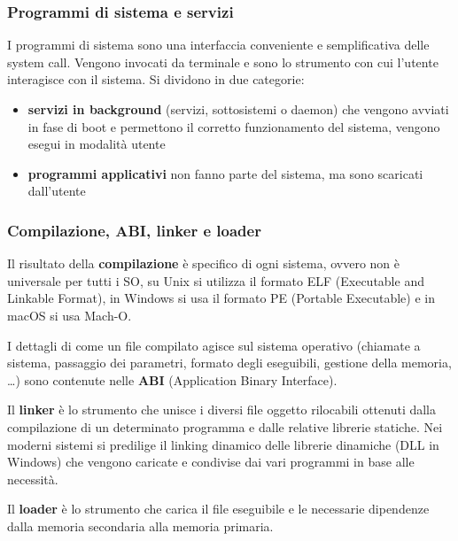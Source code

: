 \documentclass[a4paper]{article}
\begin{document}
\subsubsection*{Programmi di sistema e servizi}
I programmi di sistema sono una interfaccia conveniente e semplificativa delle system call. Vengono invocati da terminale e
sono lo strumento con cui l'utente interagisce con il sistema. Si dividono in due categorie:
\begin{itemize}
	\item \textbf{servizi in background} (servizi, sottosistemi o daemon) che vengono avviati in fase di boot e permettono il
	corretto funzionamento del sistema, vengono esegui in modalità utente
	\item \textbf{programmi applicativi} non fanno parte del sistema, ma sono scaricati dall'utente
\end{itemize}

\subsubsection*{Compilazione, ABI, linker e loader}
Il risultato della \textbf{compilazione} è specifico di ogni sistema, ovvero non è universale per tutti i SO, su Unix si utilizza il formato
ELF (Executable and Linkable Format), in Windows si usa il formato PE (Portable Executable) e in macOS si usa Mach-O.

I dettagli di come un file compilato agisce sul sistema operativo (chiamate a sistema, passaggio dei parametri, formato degli
eseguibili, gestione della memoria, \dots) sono contenute nelle \textbf{ABI} (Application Binary Interface).

Il \textbf{linker} è lo strumento che unisce i diversi file oggetto rilocabili ottenuti dalla compilazione di un determinato
programma e dalle relative librerie statiche. Nei moderni sistemi si predilige il linking dinamico delle librerie dinamiche
(DLL in Windows) che vengono caricate e condivise dai vari programmi in base alle necessità.

Il \textbf{loader} è lo strumento che carica il file eseguibile e le necessarie dipendenze dalla memoria secondaria alla memoria
primaria.


\end{document}
